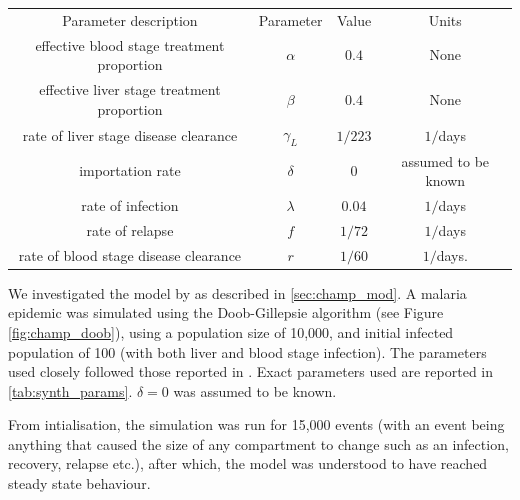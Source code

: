\begin{tabular}{c | c | c | c}\label{tab:synth_params}
    Parameter description                      & Parameter           & Value
                                               & Units                           \\
    effective blood stage treatment proportion & $\alpha$            & $0.4$
                                               & None                            \\
    effective liver stage treatment proportion & $\beta $            & $0.4$
                                               & None                            \\
    rate of liver stage disease clearance      & $\gamma_L$          & $1 / 223$
                                               & $1/$days                        \\
    importation rate                           & $\delta$            & $0$
                                               & assumed to be known             \\
    rate of infection                          & $\lambda$           & $0.04$
                                               & $1/$days                        \\
    rate of relapse                            & $f$                 & $1/72$
                                               & $1/$days                        \\
    rate of blood stage disease clearance      & $r$                 & $1/60$
                                               & $1/$days.                       \\
\end{tabular}

We investigated the model by \cite{champagne_using_2022} as described in
\ref{sec:champ_mod}. A malaria epidemic was simulated using the Doob-Gillepsie
algorithm (see Figure \ref{fig:champ_doob}), using a population
size of 10,000, and initial infected population of 100 (with both liver and blood
stage infection). The parameters used closely followed those reported in
\cite{champagne_using_2022}. Exact parameters used are reported in
\ref{tab:synth_params}. $\delta = 0$ was assumed to be known.

From intialisation, the simulation was run for 15,000 events
(with an event being anything that caused the size of any compartment to change
such as an infection, recovery, relapse etc.), after which, the model was
understood to have reached steady state behaviour.

